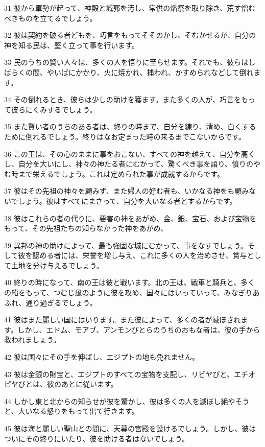 \par 31 彼から軍勢が起って、神殿と城郭を汚し、常供の燔祭を取り除き、荒す憎むべきものを立てるでしょう。
\par 32 彼は契約を破る者どもを、巧言をもってそそのかし、そむかせるが、自分の神を知る民は、堅く立って事を行います。
\par 33 民のうちの賢い人々は、多くの人を悟りに至らせます。それでも、彼らはしばらくの間、やいばにかかり、火に焼かれ、捕われ、かすめられなどして倒れます。
\par 34 その倒れるとき、彼らは少しの助けを獲ます。また多くの人が、巧言をもって彼らにくみするでしょう。
\par 35 また賢い者のうちのある者は、終りの時まで、自分を練り、清め、白くするために倒れるでしょう。終りはなお定まった時の来るまでこないからです。
\par 36 この王は、その心のままに事をおこない、すべての神を越えて、自分を高くし、自分を大いにし、神々の神たる者にむかって、驚くべき事を語り、憤りのやむ時まで栄えるでしょう。これは定められた事が成就するからです。
\par 37 彼はその先祖の神々を顧みず、また婦人の好む者も、いかなる神をも顧みないでしょう。彼はすべてにまさって、自分を大いなる者とするからです。
\par 38 彼はこれらの者の代りに、要害の神をあがめ、金、銀、宝石、および宝物をもって、その先祖たちの知らなかった神をあがめ、
\par 39 異邦の神の助けによって、最も強固な城にむかって、事をなすでしょう。そして彼を認める者には、栄誉を増し与え、これに多くの人を治めさせ、賞与として土地を分け与えるでしょう。
\par 40 終りの時になって、南の王は彼と戦います。北の王は、戦車と騎兵と、多くの船をもって、つむじ風のように彼を攻め、国々にはいっていって、みなぎりあふれ、通り過ぎるでしょう。
\par 41 彼はまた麗しい国にはいります。また彼によって、多くの者が滅ぼされます。しかし、エドム、モアブ、アンモンびとらのうちのおもな者は、彼の手から救われましょう。
\par 42 彼は国々にその手を伸ばし、エジプトの地も免れません。
\par 43 彼は金銀の財宝と、エジプトのすべての宝物を支配し、リビヤびと、エチオピヤびとは、彼のあとに従います。
\par 44 しかし東と北からの知らせが彼を驚かし、彼は多くの人を滅ぼし絶やそうと、大いなる怒りをもって出て行きます。
\par 45 彼は海と麗しい聖山との間に、天幕の宮殿を設けるでしょう。しかし、彼はついにその終りにいたり、彼を助ける者はないでしょう。

